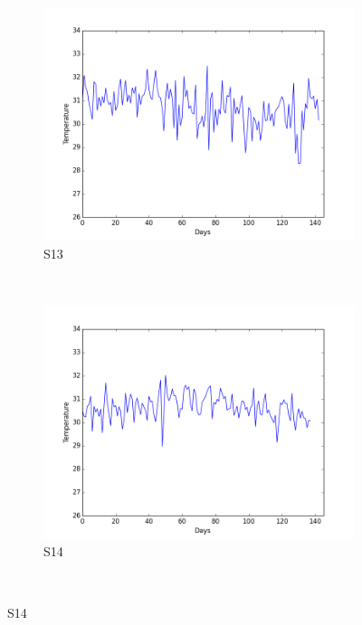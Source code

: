 \documentclass[12pt]{article} %
\begin{document}
\begin{figure}[H]
    \begin{subfigure}[b]{0.30\textwidth}
        \includegraphics[width=\textwidth]{img/graphs/13-skintemp-1}
        \caption{S13}
        \label{fig:s13ST}
    \end{subfigure}
    ~ %
    \begin{subfigure}[b]{0.30\textwidth}
        \includegraphics[width=\textwidth]{img/graphs/14-skintemp-1}
        \caption{S14}
        \label{fig:s14ST}
    \end{subfigure}
    ~ %

\end{figure}
\end{document}
